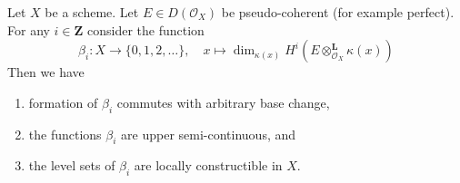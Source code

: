 \begin{lemma}
\label{lemma-jump-loci}
Let $X$ be a scheme. Let $E \in D(\mathcal{O}_X)$ be pseudo-coherent
(for example perfect). For any $i \in \mathbf{Z}$ consider the function
$$
\beta_i : X \longrightarrow \{0, 1, 2, \ldots\},\quad
x \longmapsto
\dim_{\kappa(x)}
H^i(E \otimes_{\mathcal{O}_X}^\mathbf{L} \kappa(x))
$$
Then we have
\begin{enumerate}
\item formation of $\beta_i$ commutes with arbitrary base change,
\item the functions $\beta_i$ are upper semi-continuous, and
\item the level sets of $\beta_i$ are locally constructible in $X$.
\end{enumerate}
\end{lemma}

